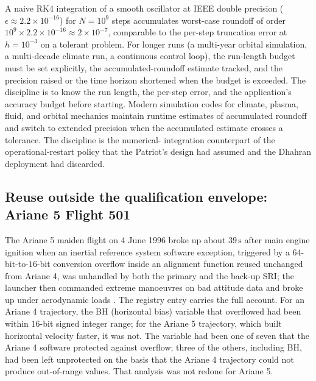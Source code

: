 A naive RK4 integration of a smooth oscillator at IEEE double
precision ($\epsilon \approx 2.2 \times 10^{-16}$) for $N = 10^{9}$
steps accumulates worst-case roundoff of order $10^{9} \times 2.2
\times 10^{-16} \approx 2 \times 10^{-7}$, comparable to the
per-step truncation error at $h = 10^{-3}$ on a tolerant problem.
For longer runs (a multi-year orbital simulation, a multi-decade
climate run, a continuous control loop), the run-length budget
must be set explicitly, the accumulated-roundoff estimate tracked,
and the precision raised or the time horizon shortened when the
budget is exceeded. The discipline is to know the run length, the
per-step error, and the application's accuracy budget before
starting. Modern simulation codes for climate, plasma, fluid, and
orbital mechanics maintain runtime estimates of accumulated
roundoff and switch to extended precision when the accumulated
estimate crosses a tolerance. The discipline is the numerical-
integration counterpart of the operational-restart policy that the
Patriot's design had assumed and the Dhahran deployment had
discarded.

\subsection{Reuse outside the qualification envelope: Ariane 5 Flight 501}

The Ariane 5 maiden flight on 4 June 1996 broke up about $39\,\si{
\second}$ after main engine ignition when an inertial reference
system software exception, triggered by a $64$-bit-to-$16$-bit
conversion overflow inside an alignment function reused unchanged
from Ariane 4, was unhandled by both the primary and the back-up
SRI; the launcher then commanded extreme manoeuvres on bad
attitude data and broke up under aerodynamic loads
\cite{acc:ariane501-ifr}. The registry entry
 carries the
full account. For an Ariane 4 trajectory, the BH (horizontal
bias) variable that overflowed had been within $16$-bit signed
integer range; for the Ariane 5 trajectory, which built horizontal
velocity faster, it was not. The variable had been one of seven
that the Ariane 4 software protected against overflow; three of
the others, including BH, had been left unprotected on the basis
that the Ariane 4 trajectory could not produce out-of-range
values. That analysis was not redone for Ariane 5.

